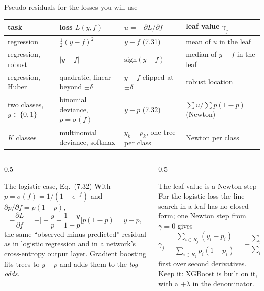 \documentclass[10pt,aspectratio=169]{beamer}
\newcommand{\sgn}{\mathrm{sign}}
\begin{document}
\begin{frame}{Pseudo-residuals for the losses you will use}
\footnotesize
\begin{center}
\scriptsize
\begin{tabular}{@{}llll@{}}
\toprule
task & loss $L(y,f)$ & $u=-\partial L/\partial f$ & leaf value $\gamma_j$\\
\midrule
regression & $\frac12(y-f)^2$ & $y-f$ \quad (7.31) & mean of $u$ in the leaf\\
regression, robust & $|y-f|$ & $\sgn(y-f)$ & median of $y-f$ in the leaf\\
regression, Huber & quadratic, linear beyond $\pm\delta$ & $y-f$ clipped at $\pm\delta$ & robust location\\
two classes, $y\in\{0,1\}$ & binomial deviance, $p=\sigma(f)$ & $y-p$ \quad (7.32) & $\sum u/\sum p(1-p)$ (Newton)\\
$K$ classes & multinomial deviance, softmax & $y_k-p_k$, one tree per class & Newton per class\\
\bottomrule
\end{tabular}
\normalsize
\end{center}
\begin{columns}[T]
\begin{column}{0.5\textwidth}
\begin{block}{The logistic case, Eq.\ (7.32)}
With $p=\sigma(f)=1/(1+e^{-f})$ and $\partial p/\partial f=p(1-p)$,
\[
-\frac{\partial L}{\partial f}=-\Big[-\frac{y}{p}+\frac{1-y}{1-p}\Big]p(1-p)=y-p ,
\]
the same ``observed minus predicted'' residual as in logistic regression
and in a network's cross-entropy output layer.  Gradient boosting fits
trees to $y-p$ and adds them to the \emph{log-odds}.
\end{block}
\end{column}
\begin{column}{0.5\textwidth}
\begin{block}{The leaf value is a Newton step}
For the logistic loss the line search in a leaf has no closed form; one
Newton step from $\gamma=0$ gives
\[
\gamma_j=\frac{\sum_{i\in R_j}(y_i-p_i)}{\sum_{i\in R_j}p_i(1-p_i)}
=-\frac{\sum_i g_i}{\sum_i h_i},
\]
first over second derivatives.  Keep it: XGBoost is built on it, with a
$+\lambda$ in the denominator.
\end{block}
\end{column}
\end{columns}
\end{frame}

\end{document}
